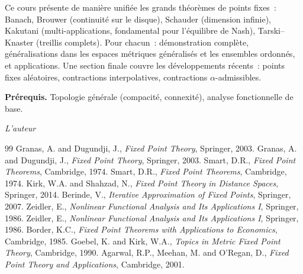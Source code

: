 \documentclass[12pt,a4paper,twoside]{book}
\theoremstyle{definition}
\theoremstyle{plain}
\theoremstyle{remark}
\begin{document}
\medskip

Ce cours pr\'esente de mani\`ere unifi\'ee les grands th\'eor\`emes de points fixes~: Banach, Brouwer (continuit\'e sur le disque), Schauder (dimension infinie), Kakutani (multi-applications, fondamental pour l'\'equilibre de Nash), Tarski--Knaster (treillis complets). Pour chacun~: d\'emonstration compl\`ete, g\'en\'eralisations dans les espaces m\'etriques g\'en\'eralis\'es et les ensembles ordonn\'es, et applications. Une section finale couvre les d\'eveloppements r\'ecents~: points fixes al\'eatoires, contractions interpolatives, contractions $\alpha$-admissibles.

\medskip

\noindent\textbf{Pr\'erequis.} Topologie g\'en\'erale (compacit\'e, connexit\'e), analyse fonctionnelle de base.

\vfill
\hfill\textit{L'auteur}


\mainmatter














\backmatter
\begin{thebibliography}{99}
 Granas, A. and Dugundji, J., \emph{Fixed Point Theory}, Springer, 2003.
 Granas, A. and Dugundji, J., \emph{Fixed Point Theory}, Springer, 2003.
 Smart, D.R., \emph{Fixed Point Theorems}, Cambridge, 1974.
 Smart, D.R., \emph{Fixed Point Theorems}, Cambridge, 1974.
 Kirk, W.A. and Shahzad, N., \emph{Fixed Point Theory in Distance Spaces}, Springer, 2014.
 Berinde, V., \emph{Iterative Approximation of Fixed Points}, Springer, 2007.
 Zeidler, E., \emph{Nonlinear Functional Analysis and Its Applications I}, Springer, 1986.
 Zeidler, E., \emph{Nonlinear Functional Analysis and Its Applications I}, Springer, 1986.
 Border, K.C., \emph{Fixed Point Theorems with Applications to Economics}, Cambridge, 1985.
 Goebel, K. and Kirk, W.A., \emph{Topics in Metric Fixed Point Theory}, Cambridge, 1990.
 Agarwal, R.P., Meehan, M. and O'Regan, D., \emph{Fixed Point Theory and Applications}, Cambridge, 2001.
\end{thebibliography}
\printindex
\end{document}
